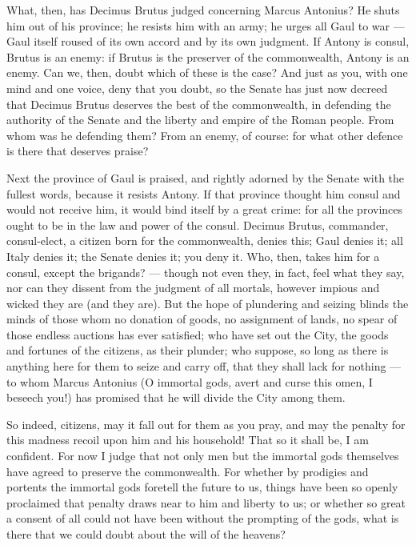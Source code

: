  What, then, has Decimus Brutus judged concerning Marcus Antonius? He shuts him out of his province; he resists him with an army; he urges all Gaul to war --- Gaul itself roused of its own accord and by its own judgment. If Antony is consul, Brutus is an enemy: if Brutus is the preserver of the commonwealth, Antony is an enemy. Can we, then, doubt which of these is the case? And just as you, with one mind and one voice, deny that you doubt, so the Senate has just now decreed that Decimus Brutus deserves the best of the commonwealth, in defending the authority of the Senate and the liberty and empire of the Roman people. From whom was he defending them? From an enemy, of course: for what other defence is there that deserves praise?

 Next the province of Gaul is praised, and rightly adorned by the Senate with the fullest words, because it resists Antony. If that province thought him consul and would not receive him, it would bind itself by a great crime: for all the provinces ought to be in the law and power of the consul. Decimus Brutus, commander, consul-elect, a citizen born for the commonwealth, denies this; Gaul denies it; all Italy denies it; the Senate denies it; you deny it. Who, then, takes him for a consul, except the brigands? --- though not even they, in fact, feel what they say, nor can they dissent from the judgment of all mortals, however impious and wicked they are (and they are). But the hope of plundering and seizing blinds the minds of those whom no donation of goods, no assignment of lands, no spear of those endless auctions has ever satisfied; who have set out the City, the goods and fortunes of the citizens, as their plunder; who suppose, so long as there is anything here for them to seize and carry off, that they shall lack for nothing --- to whom Marcus Antonius (O immortal gods, avert and curse this omen, I beseech you!) has promised that he will divide the City among them.

 So indeed, citizens, may it fall out for them as you pray, and may the penalty for this madness recoil upon him and his household! That so it shall be, I am confident. For now I judge that not only men but the immortal gods themselves have agreed to preserve the commonwealth. For whether by prodigies and portents the immortal gods foretell the future to us, things have been so openly proclaimed that penalty draws near to him and liberty to us; or whether so great a consent of all could not have been without the prompting of the gods, what is there that we could doubt about the will of the heavens?

